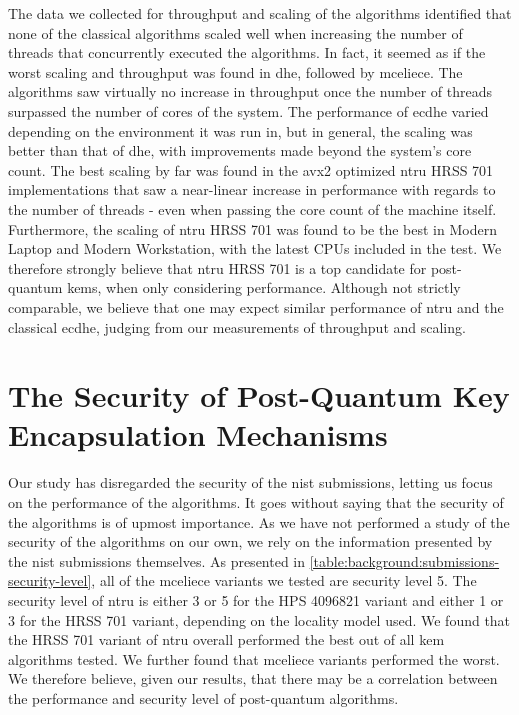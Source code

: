 The data we collected for throughput and scaling of the algorithms identified that none of the classical algorithms scaled well when increasing the number of threads that concurrently executed the algorithms. In fact, it seemed as if the worst scaling and throughput was found in \gls{dhe}, followed by \gls{mceliece}. The algorithms saw virtually no increase in throughput once the number of threads surpassed the number of cores of the system. The performance of \gls{ecdhe} varied depending on the environment it was run in, but in general, the scaling was better than that of \gls{dhe}, with improvements made beyond the system's core count. The best scaling by far was found in the \gls{avx2} optimized \gls{ntru} HRSS 701 implementations that saw a near-linear increase in performance with regards to the number of threads - even when passing the core count of the machine itself. Furthermore, the scaling of \gls{ntru} HRSS 701 was found to be the best in Modern Laptop and Modern Workstation, with the latest CPUs included in the test. We therefore strongly believe that \gls{ntru} HRSS 701 is a top candidate for \gls{post-quantum} \glspl{kem}, when only considering performance. Although not strictly comparable, we believe that one may expect similar performance of \gls{ntru} and the classical \gls{ecdhe}, judging from our measurements of throughput and scaling.


\section{The Security of Post-Quantum Key Encapsulation Mechanisms}
\label{section:discussion:post-quantum-security}

Our study has disregarded the security of the \gls{nist} submissions, letting us focus on the performance of the algorithms. It goes without saying that the security of the algorithms is of upmost importance. As we have not performed a study of the security of the algorithms on our own, we rely on the information presented by the \gls{nist} submissions themselves. As presented in \ref{table:background:submissions-security-level}, all of the \gls{mceliece} variants we tested are security level 5. The security level of \gls{ntru} is either 3 or 5 for the HPS 4096821 variant and either 1 or 3 for the HRSS 701 variant, depending on the locality model used. We found that the HRSS 701 variant of \gls{ntru} overall performed the best out of all \gls{kem} algorithms tested. We further found that \gls{mceliece} variants performed the worst. We therefore believe, given our results, that there may be a correlation between the performance and security level of \gls{post-quantum} algorithms.

